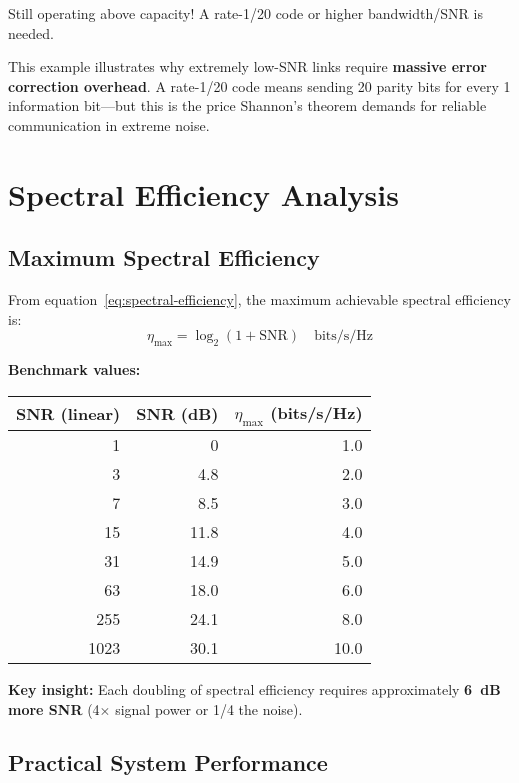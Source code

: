 Still operating above capacity! A rate-1/20 code or higher bandwidth/SNR is needed.

\begin{warningbox}
This example illustrates why extremely low-SNR links require \textbf{massive error correction overhead}. A rate-1/20 code means sending 20 parity bits for every 1 information bit---but this is the price Shannon's theorem demands for reliable communication in extreme noise.
\end{warningbox}

\section{Spectral Efficiency Analysis}

\subsection{Maximum Spectral Efficiency}

From equation~\eqref{eq:spectral-efficiency}, the maximum achievable spectral efficiency is:
\begin{equation}
\eta_{\max} = \log_2(1 + \mathrm{SNR}) \quad \text{bits/s/Hz}
\end{equation}

\textbf{Benchmark values:}

\begin{center}
\begin{tabular}{@{}rrr@{}}
\toprule
SNR (linear) & SNR (dB) & $\eta_{\max}$ (bits/s/Hz) \\
\midrule
1 & 0 & 1.0 \\
3 & 4.8 & 2.0 \\
7 & 8.5 & 3.0 \\
15 & 11.8 & 4.0 \\
31 & 14.9 & 5.0 \\
63 & 18.0 & 6.0 \\
255 & 24.1 & 8.0 \\
1023 & 30.1 & 10.0 \\
\bottomrule
\end{tabular}
\end{center}

\textbf{Key insight:} Each doubling of spectral efficiency requires approximately \textbf{6~dB more SNR} (4$\times$ signal power or 1/4 the noise).

\subsection{Practical System Performance}

